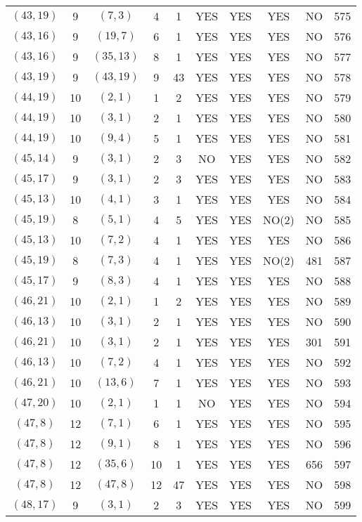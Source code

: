 \begin{longtable}{|c|c|c|c|c|c|c|c|c|c|}
$(43, 19)$ & 9 & $(7, 3)$ & 4 & 1 & YES & YES & YES & NO & 575\\
$(43, 16)$ & 9 & $(19, 7)$ & 6 & 1 & YES & YES & YES & NO & 576\\
$(43, 16)$ & 9 & $(35, 13)$ & 8 & 1 & YES & YES & YES & NO & 577\\
$(43, 19)$ & 9 & $(43, 19)$ & 9 & 43 & YES & YES & YES & NO & 578\\
$(44, 19)$ & 10 & $(2, 1)$ & 1 & 2 & YES & YES & YES & NO & 579\\
$(44, 19)$ & 10 & $(3, 1)$ & 2 & 1 & YES & YES & YES & NO & 580\\
$(44, 19)$ & 10 & $(9, 4)$ & 5 & 1 & YES & YES & YES & NO & 581\\
$(45, 14)$ & 9 & $(3, 1)$ & 2 & 3 & NO & YES & YES & NO & 582\\
$(45, 17)$ & 9 & $(3, 1)$ & 2 & 3 & YES & YES & YES & NO & 583\\
$(45, 13)$ & 10 & $(4, 1)$ & 3 & 1 & YES & YES & YES & NO & 584\\
$(45, 19)$ & 8 & $(5, 1)$ & 4 & 5 & YES & YES & NO(2) & NO & 585\\
$(45, 13)$ & 10 & $(7, 2)$ & 4 & 1 & YES & YES & YES & NO & 586\\
$(45, 19)$ & 8 & $(7, 3)$ & 4 & 1 & YES & YES & NO(2) & 481 & 587\\
$(45, 17)$ & 9 & $(8, 3)$ & 4 & 1 & YES & YES & YES & NO & 588\\
$(46, 21)$ & 10 & $(2, 1)$ & 1 & 2 & YES & YES & YES & NO & 589\\
$(46, 13)$ & 10 & $(3, 1)$ & 2 & 1 & YES & YES & YES & NO & 590\\
$(46, 21)$ & 10 & $(3, 1)$ & 2 & 1 & YES & YES & YES & 301 & 591\\
$(46, 13)$ & 10 & $(7, 2)$ & 4 & 1 & YES & YES & YES & NO & 592\\
$(46, 21)$ & 10 & $(13, 6)$ & 7 & 1 & YES & YES & YES & NO & 593\\
$(47, 20)$ & 10 & $(2, 1)$ & 1 & 1 & NO & YES & YES & NO & 594\\
$(47, 8)$ & 12 & $(7, 1)$ & 6 & 1 & YES & YES & YES & NO & 595\\
$(47, 8)$ & 12 & $(9, 1)$ & 8 & 1 & YES & YES & YES & NO & 596\\
$(47, 8)$ & 12 & $(35, 6)$ & 10 & 1 & YES & YES & YES & 656 & 597\\
$(47, 8)$ & 12 & $(47, 8)$ & 12 & 47 & YES & YES & YES & NO & 598\\
$(48, 17)$ & 9 & $(3, 1)$ & 2 & 3 & YES & YES & YES & NO & 599\\

\end{longtable}
